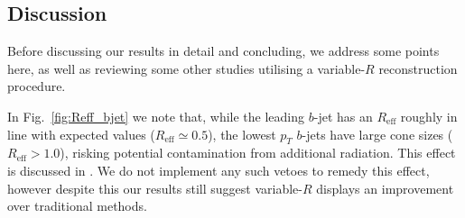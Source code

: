 \documentclass[12pt]{article}
\begin{document}
\begin{table}[!h]
\begin{center}
\caption{\label{tab:signalbackground4} Final $\Sigma$ values calculated for signal and backgrounds for ${\cal L}=140$ fb$^{-1}$  upon enforcing the reduced cuts plus the mass selection criteria $|m_{bbbb}-m_H|< 20$ GeV and $|m_{bb} - m_h|< 15$ GeV for the various jet reconstruction procedures.}
\end{center}
\end{table}

\begin{table}[!h]
\begin{center}
\caption{\label{tab:signalbackground5} Final $\Sigma$ values calculated for signal and backgrounds for ${\cal L}=300$ fb$^{-1}$  upon enforcing the reduced cuts plus the mass selection criteria $|m_{bbbb}-m_H|< 20$ GeV and $|m_{bb} - m_h|< 15$ GeV for the various jet reconstruction procedures.}
\end{center}
\end{table}

\subsection{Discussion}
Before discussing our results in detail and concluding, we address some points here, as well as reviewing some other studies utilising a variable-$R$ reconstruction procedure.

In Fig.~\ref{fig:Reff_bjet} we note that, while the leading $b$-jet has an $R_{\text{eff}}$ roughly in line with expected values ($R_{\text{eff}} \simeq 0.5$), the lowest $p_T$ $b$-jets have large cone sizes ($R_{\text{eff}} > 1.0$), risking potential contamination from additional radiation. This effect is discussed in \cite{Lapsien:2016zor}. We do not implement any such vetoes to remedy this effect, however despite this our results still suggest variable-$R$ displays an improvement over traditional methods. 
\end{document}
